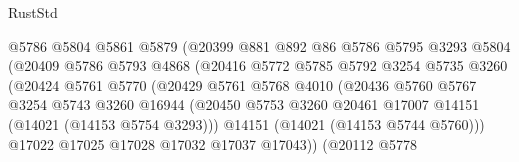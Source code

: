 \begin{lexlean}{RustStd}
\begin{coremodule}
                                  @5786
                                  @5804
                                  @5861
                                  @5879
                                  (@20399
                                    @881
                                    @892
                                    @86
                                    @5786
                                    @5795
                                    @3293
                                    @5804
                                    (@20409
                                      @5786
                                      @5793
                                      @4868
                                      (@20416
                                        @5772
                                        @5785
                                        @5792
                                        @3254
                                        @5735
                                        @3260
                                        (@20424
                                          @5761
                                          @5770
                                          (@20429
                                            @5761
                                            @5768
                                            @4010
                                            (@20436
                                              @5760
                                              @5767
                                              @3254
                                              @5743
                                              @3260
                                              @16944
                                              (@20450
                                                @5753
                                                @3260
                                                @20461
                                                @17007
                                                @14151
                                                (@14021 (@14153 @5754 @3293)))
                                              @14151
                                              (@14021 (@14153 @5744 @5760)))
                                            @17022
                                            @17025
                                            @17028
                                            @17032
                                            @17037
                                            @17043))
                                        (@20112
                                          @5778

\end{coremodule}
\end{lexlean}
